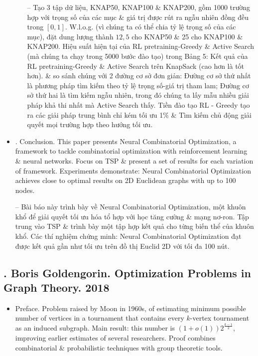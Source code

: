 \documentclass{article}
\begin{document}
\begin{itemize}
\begin{enumerate}
        -- Tạo 3 tập dữ liệu, KNAP50, KNAP100 \& KNAP200, gồm 1000 trường hợp với trọng số của các mục \& giá trị được rút ra ngẫu nhiên đồng đều trong $[0,1]$. W.l.o.g. (vì chúng ta có thể chia tỷ lệ trọng số của các mục), đặt dung lượng thành $12,5$ cho KNAP50 \& 25 cho KNAP100 \& KNAP200. Hiệu suất hiện tại của RL pretraining-Greedy \& Active Search (mà chúng ta chạy trong 5000 bước đào tạo) trong {\sf Bảng 5: Kết quả của RL pretraining-Greedy \& Active Search trên KnapSack (cao hơn là tốt hơn).} \& so sánh chúng với 2 đường cơ sở đơn giản: Đường cơ sở thứ nhất là phương pháp tìm kiếm theo tỷ lệ trọng số-giá trị tham lam; Đường cơ sở thứ hai là tìm kiếm ngẫu nhiên, trong đó chúng ta lấy mẫu nhiều giải pháp khả thi nhất mà Active Search thấy. Tiền đào tạo RL - Greedy tạo ra các giải pháp trung bình chỉ kém tối ưu 1\% \& Tìm kiếm chủ động giải quyết mọi trường hợp theo hướng tối ưu.        
    \end{enumerate}
    \item {. Conclusion.} This paper presents Neural Combinatorial Optimization, a framework to tackle combinatorial optimization with reinforcement learning \& neural networks. Focus on TSP \& present a set of results for each variation of framework. Experiments demonstrate: Neural Combinatorial Optimization achieves close to optimal results on 2D Euclidean graphs with up to 100 nodes.
    
    -- Bài báo này trình bày về Neural Combinatorial Optimization, một khuôn khổ để giải quyết tối ưu hóa tổ hợp với học tăng cường \& mạng nơ-ron. Tập trung vào TSP \& trình bày một tập hợp kết quả cho từng biến thể của khuôn khổ. Các thí nghiệm chứng minh: Neural Combinatorial Optimization đạt được kết quả gần như tối ưu trên đồ thị Euclid 2D với tối đa 100 nút.
\end{itemize}


\subsection{\cite{Goldengorin2018}. {\sc Boris Goldengorin}. Optimization Problems in Graph Theory. 2018}

\begin{itemize}
    \item {\sf Preface.} Problem raised by Moon in 1960s, of estimating minimum possible number of vertices in a tournament that contains every $k$-vertex tournament as an induced subgraph. Main result: this number is $(1 + o(1))2^{\frac{k-1}{2}}$, improving earlier estimates of several researchers. Proof combines combinatorial \& probabilistic techniques with group theoretic tools.
\end{itemize}
\end{document}

